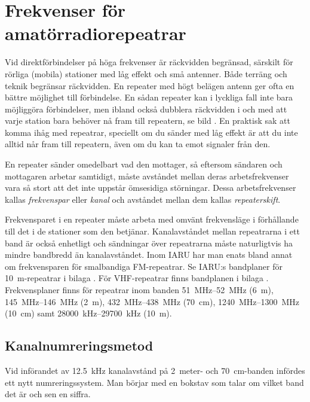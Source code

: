 \chapter[Svenska repeatrar]{Frekvenser för amatörradiorepeatrar}
\label{svenska repeatrar}

\noindent Vid direktförbindelser på höga frekvenser är räckvidden begränsad,
särskilt för rörliga (mobila) stationer med låg effekt och små antenner.
Både terräng och teknik begränsar räckvidden.
En repeater med högt belägen antenn ger ofta en bättre möjlighet till förbindelse.
En sådan repeater kan i lyckliga fall inte bara möjliggöra förbindelser, men
ibland också dubblera räckvidden i och med att varje station bara
behöver nå fram till repeatern, se bild .  En praktisk sak att komma ihåg med
repeatrar, speciellt om du sänder med låg effekt är att du inte alltid
når fram till repeatern, även om du kan ta emot signaler från den. 

En repeater sänder omedelbart vad den mottager, så eftersom sändaren och
mottagaren arbetar samtidigt, måste avståndet mellan deras arbetsfrekvenser vara
så stort att det inte uppstår ömsesidiga störningar.
Dessa arbetsfrekvenser kallas \emph{frekvenspar} eller \emph{kanal} och avståndet mellan dem
kallas \emph{repeaterskift}.

Frekvensparet i en repeater måste arbeta med omvänt frekvensläge i förhållande
till det i de stationer som den betjänar.
Kanalavståndet mellan repeatrarna i ett band är också enhetligt och sändningar
över repeatrarna måste naturligtvis ha mindre bandbredd än kanalavståndet.
Inom IARU har man enats bland annat om frekvensparen för smalbandiga
FM-repeatrar.
Se IARU:s bandplaner för \SI{10}{\metre}-repeatrar i bilaga .
För VHF-repeatrar finns bandplanen i bilaga .
Frekvensplaner finns för repeatrar inom banden \SIrange{51}{52}{\mega\hertz}
(\SI{6}{\metre}), \SIrange{145}{146}{\mega\hertz} (\SI{2}{\metre}),
\SIrange{432}{438}{\mega\hertz} (\SI{70}{\centi\metre}),
\SIrange{1240}{1300}{\mega\hertz} (\SI{10}{\centi\metre}) samt
\SIrange{28000}{29700}{\kilo\hertz} (\SI{10}{\metre}).

\section{Kanalnumreringsmetod}
Vid införandet av \SI{12,5}{\kilo\hertz} kanalavstånd på 2~meter- och
\SI{70}{\centi\metre}-banden infördes ett nytt numreringssystem.
Man börjar med en bokstav som talar om vilket band det är och sen en
siffra.

